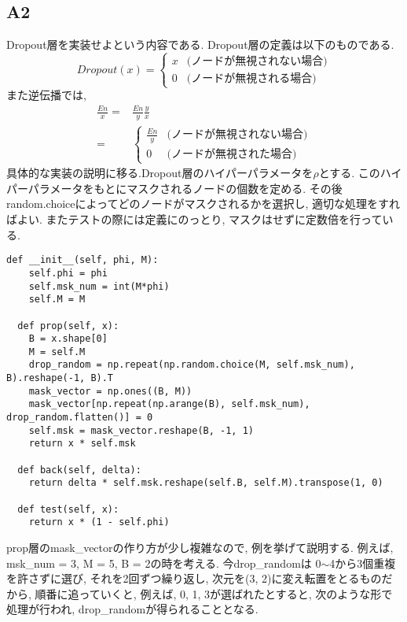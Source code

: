 \documentclass[a4paper,11pt]{jsarticle}
\begin{document}
\subsection{A2}
Dropout層を実装せよという内容である. Dropout層の定義は以下のものである.
\begin{equation}
  Dropout(x) = 
  \begin{cases}
    x & \text{(ノードが無視されない場合)} \\
    0 & \text{(ノードが無視される場合)}
  \end{cases}
\end{equation}
また逆伝播では,
\begin{equation}
  \begin{split}
  \frac{En}{x} = & \frac{En}{y}\frac{y}{x}  \\= &
  \begin{cases}
    \frac{En}{y} & \text{(ノードが無視されない場合)} \\
    0 & \text{(ノードが無視された場合)}
  \end{cases}
\end{split}
\end{equation}
具体的な実装の説明に移る.Dropout層のハイパーパラメータを$\rho$とする.
このハイパーパラメータをもとにマスクされるノードの個数を定める.
その後random.choiceによってどのノードがマスクされるかを選択し, 
適切な処理をすればよい. またテストの際には定義にのっとり, 
マスクはせずに定数倍を行っている.
\begin{lstlisting}[caption=Dropout]
  def __init__(self, phi, M):
    self.phi = phi
    self.msk_num = int(M*phi)
    self.M = M

  def prop(self, x):
    B = x.shape[0]
    M = self.M
    drop_random = np.repeat(np.random.choice(M, self.msk_num), B).reshape(-1, B).T
    mask_vector = np.ones((B, M))
    mask_vector[np.repeat(np.arange(B), self.msk_num), drop_random.flatten()] = 0
    self.msk = mask_vector.reshape(B, -1, 1)
    return x * self.msk

  def back(self, delta):
    return delta * self.msk.reshape(self.B, self.M).transpose(1, 0)

  def test(self, x):
    return x * (1 - self.phi)
\end{lstlisting}
prop層のmask\_vectorの作り方が少し複雑なので, 例を挙げて説明する.
例えば, msk\_num = 3, M = 5, B = 2の時を考える. 今drop\_randomは
0$\sim$4から3個重複を許さずに選び, それを2回ずつ繰り返し, 次元を(3, 2)に変え転置をとるものだから, 順番に追っていくと, 
例えば, 0, 1, 3が選ばれたとすると, 次のような形で処理が行われ, drop\_randomが得られることとなる.
\end{document}
